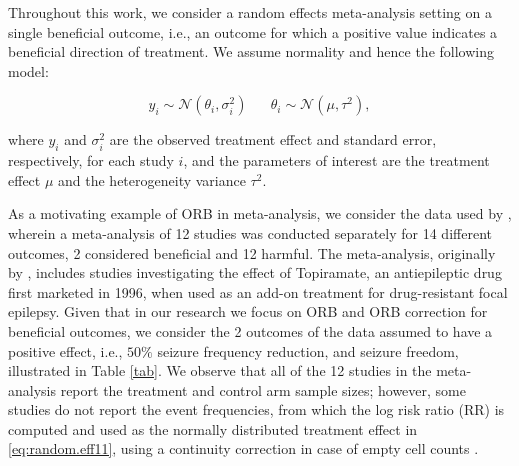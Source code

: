 \documentclass[twocolumn]{article}\usepackage[]{graphicx}\usepackage[]{xcolor}
\providecommand{\DIFaddtex}[1]{{\protect\color{blue}\uwave{#1}}} %
\providecommand{\DIFaddbegin}{} %
\providecommand{\DIFaddend}{} %
\providecommand{\DIFadd}[1]{\texorpdfstring{\DIFaddtex{#1}}{#1}} %
\newcommand{\DIFaddincludegraphics}[2][]{{\color{blue}\fbox{\DIFOincludegraphics[#1]{#2}}}} %
\DeclareRobustCommand{\DIFaddbegin}{\DIFOaddbegin \let\includegraphics\DIFaddincludegraphics} %
\DeclareRobustCommand{\DIFaddend}{\DIFOaddend \let\includegraphics\DIFOincludegraphics} %
\begin{document}
\DIFaddend Throughout this work, we consider a random effects meta-analysis setting on a single beneficial outcome, i.e., an outcome for which a positive value indicates a beneficial direction of treatment. We assume normality and hence the following model:

\bigskip

\begin{equation}\label{eq:random.eff11}
y_i \sim \mathcal{N}(\theta_i, \sigma_i^2) \; \; \; \; \; \; \theta_i \sim \mathcal{N}(\mu, \tau^2),
\end{equation}

\bigskip

where $y_i$ and $\sigma_i^2$ are the observed treatment effect and \DIFaddbegin \DIFadd{squared }\DIFaddend standard error, respectively, for each study $i$, and the parameters of interest are the treatment effect $\mu$ and the heterogeneity variance $\tau^2$.

As a motivating example of ORB in meta-analysis, we consider the data used by \citet{Copas2019}, wherein a meta-analysis of 12 studies was conducted separately for 14 different outcomes, 2 considered beneficial and 12 harmful. The meta-analysis, originally by \citet{topiramate}, includes studies investigating the effect of Topiramate, an antiepileptic drug first marketed in 1996, when used as an add-on treatment for drug-resistant focal epilepsy. Given that in our research we focus on ORB and ORB correction for beneficial outcomes, we consider the 2 outcomes of the data assumed to have a positive effect, i.e., $50 \%$ seizure frequency reduction, and seizure freedom, illustrated in Table \ref{tab}. We observe that all of the 12 studies in the meta-analysis report the treatment and control arm sample sizes; however, some studies do not report the event frequencies, from which the log risk ratio (RR) is computed and used as the normally distributed treatment effect in \eqref{eq:random.eff11}, using a continuity correction in case of empty cell counts \citep{Copas2019}.
\end{document}
